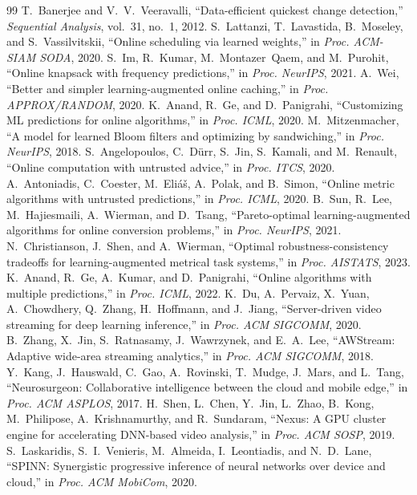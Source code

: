 ﻿\documentclass[lettersize,journal]{IEEEtran}
\begin{document}
\begin{thebibliography}{99}
 T.~Banerjee and V.~V.~Veeravalli, ``Data-efficient quickest change detection,'' \emph{Sequential Analysis}, vol.~31, no.~1, 2012.
 S.~Lattanzi, T.~Lavastida, B.~Moseley, and S.~Vassilvitskii, ``Online scheduling via learned weights,'' in \emph{Proc. ACM-SIAM SODA}, 2020.
 S.~Im, R.~Kumar, M.~Montazer~Qaem, and M.~Purohit, ``Online knapsack with frequency predictions,'' in \emph{Proc. NeurIPS}, 2021.
 A.~Wei, ``Better and simpler learning-augmented online caching,'' in \emph{Proc. APPROX/RANDOM}, 2020.
 K.~Anand, R.~Ge, and D.~Panigrahi, ``Customizing ML predictions for online algorithms,'' in \emph{Proc. ICML}, 2020.
 M.~Mitzenmacher, ``A model for learned Bloom filters and optimizing by sandwiching,'' in \emph{Proc. NeurIPS}, 2018.
 S.~Angelopoulos, C.~D\"urr, S.~Jin, S.~Kamali, and M.~Renault, ``Online computation with untrusted advice,'' in \emph{Proc. ITCS}, 2020.
 A.~Antoniadis, C.~Coester, M.~Eli\'a\v{s}, A.~Polak, and B.~Simon, ``Online metric algorithms with untrusted predictions,'' in \emph{Proc. ICML}, 2020.
 B.~Sun, R.~Lee, M.~Hajiesmaili, A.~Wierman, and D.~Tsang, ``Pareto-optimal learning-augmented algorithms for online conversion problems,'' in \emph{Proc. NeurIPS}, 2021.
 N.~Christianson, J.~Shen, and A.~Wierman, ``Optimal robustness-consistency tradeoffs for learning-augmented metrical task systems,'' in \emph{Proc. AISTATS}, 2023.
 K.~Anand, R.~Ge, A.~Kumar, and D.~Panigrahi, ``Online algorithms with multiple predictions,'' in \emph{Proc. ICML}, 2022.
 K.~Du, A.~Pervaiz, X.~Yuan, A.~Chowdhery, Q.~Zhang, H.~Hoffmann, and J.~Jiang, ``Server-driven video streaming for deep learning inference,'' in \emph{Proc. ACM SIGCOMM}, 2020.
 B.~Zhang, X.~Jin, S.~Ratnasamy, J.~Wawrzynek, and E.~A.~Lee, ``AWStream: Adaptive wide-area streaming analytics,'' in \emph{Proc. ACM SIGCOMM}, 2018.
 Y.~Kang, J.~Hauswald, C.~Gao, A.~Rovinski, T.~Mudge, J.~Mars, and L.~Tang, ``Neurosurgeon: Collaborative intelligence between the cloud and mobile edge,'' in \emph{Proc. ACM ASPLOS}, 2017.
 H.~Shen, L.~Chen, Y.~Jin, L.~Zhao, B.~Kong, M.~Philipose, A.~Krishnamurthy, and R.~Sundaram, ``Nexus: A GPU cluster engine for accelerating DNN-based video analysis,'' in \emph{Proc. ACM SOSP}, 2019.
 S.~Laskaridis, S.~I.~Venieris, M.~Almeida, I.~Leontiadis, and N.~D.~Lane, ``SPINN: Synergistic progressive inference of neural networks over device and cloud,'' in \emph{Proc. ACM MobiCom}, 2020.

\end{thebibliography}
\end{document}
